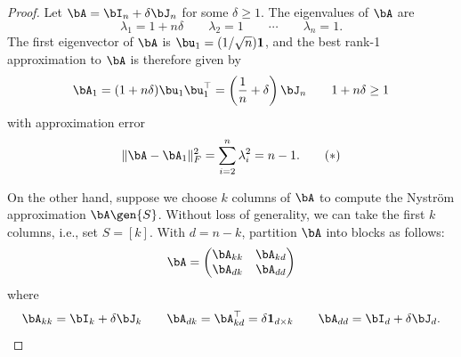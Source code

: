 \begin{proof}
Let $\bA = \bI_n + \delta\bJ_n$ for some $\delta \geq 1$. The eigenvalues of $\bA$ are 
\[\lambda_1 = 1+n\delta \qquad \lambda_2 = 1\qquad\cdots\qquad \lambda_n = 1.\]
The first eigenvector of $\bA$ is $\bu_1 = (1/\sqrt n)\mathbf{1}$, and the best rank-1 approximation to $\bA$ is therefore given by
\[\bA_1 = (1 + n\delta)\bu_1\bu_1^\top = \left(\frac{1}{n}+\delta\right)\bJ_n \qquad 1 + n\delta \geq 1\]
with approximation error
\begin{align*}
    \|\bA - \bA_1\|^2_F = \sum_{i=2}^n\lambda_i^2 =n-1.\tag{$\ast$}
\end{align*}

On the other hand, suppose we choose $k$ columns of $\bA$ to compute the Nystr\"om approximation $\bA\gen{S}$. Without loss of generality, we can take the first $k$ columns, i.e., set $S = [k]$. With $d = n-k$, partition $\bA$ into blocks as follows:
\[\bA = \begin{pmatrix}
    \bA_{kk} & \bA_{kd}\\
    \bA_{dk} & \bA_{dd}
\end{pmatrix}\]
where 
\[\bA_{kk} = \bI_k + \delta\bJ_k\qquad \bA_{dk} = \bA_{kd}^\top = \delta\mathbf{1}_{d\times k}\qquad \bA_{dd} = \bI_d + \delta\bJ_d.\]


\end{proof}
